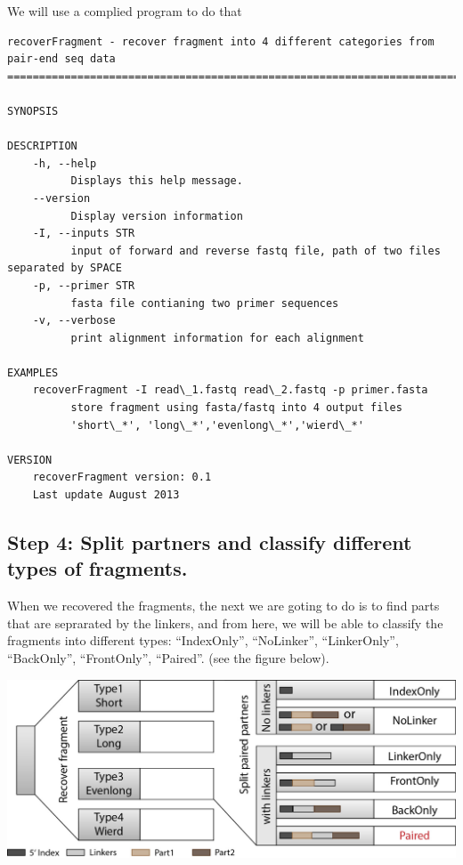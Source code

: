 \documentclass[letterpaper,10pt,english]{sphinxmanual}
\begin{document}
We will use a complied program  to do that

\begin{Verbatim}[commandchars=\\\{\}]
recoverFragment - recover fragment into 4 different categories from pair-end seq data
=====================================================================================

SYNOPSIS

DESCRIPTION
    -h, --help
          Displays this help message.
    --version
          Display version information
    -I, --inputs STR
          input of forward and reverse fastq file, path of two files separated by SPACE
    -p, --primer STR
          fasta file contianing two primer sequences
    -v, --verbose
          print alignment information for each alignment

EXAMPLES
    recoverFragment -I read\_1.fastq read\_2.fastq -p primer.fasta
          store fragment using fasta/fastq into 4 output files
          'short\_*', 'long\_*','evenlong\_*','wierd\_*'

VERSION
    recoverFragment version: 0.1
    Last update August 2013
\end{Verbatim}


\subsection{Step 4: Split partners and classify different types of fragments.}
\label{Analysis_pipeline:step4}\label{Analysis_pipeline:step-4-split-partners-and-classify-different-types-of-fragments}
When we recovered the fragments, the next we are goting to do is to find parts that are seprarated by the linkers, and from here, we will be able to classify the fragments into different types: ``IndexOnly'', ``NoLinker'', ``LinkerOnly'', ``BackOnly'', ``FrontOnly'', ``Paired''. (see the figure below).

{\hfill\includegraphics{summary.jpg}\hfill}
\end{document}

